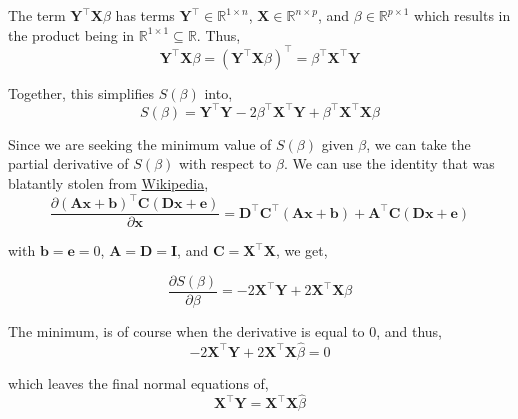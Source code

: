\documentclass[12pt,letterpaper, onecolumn]{exam}
\begin{document}
\begin{questions}
\begin{solution}
\begin{enumerate}[a.)]
            The term $\textbf{Y}^\intercal\textbf{X}\beta$ has terms $\textbf{Y}^\intercal\in\mathbb{R}^{1\times n}$, $\textbf{X}\in\mathbb{R}^{n\times p}$, and $\beta\in\mathbb{R}^{p\times1}$ which results in the product being in $\mathbb{R}^{1\times1}\subseteq\mathbb{R}$. Thus, 
            \begin{equation*}
                \textbf{Y}^\intercal\textbf{X}\beta=(\textbf{Y}^\intercal\textbf{X}\beta)^\intercal = \beta^\intercal\textbf{X}^\intercal \textbf{Y}
            \end{equation*}

            Together, this simplifies $S(\beta)$ into,
            \begin{equation*}
                S(\beta)= \textbf{Y}^\intercal\textbf{Y} - 2 \beta^\intercal\textbf{X}^\intercal\textbf{Y} + \beta^\intercal\textbf{X}^\intercal\textbf{X}\beta
            \end{equation*}

            Since we are seeking the minimum value of $S(\beta)$ given $\beta$, we can take the partial derivative of $S(\beta)$ with respect to $\beta$. We can use the identity that was blatantly stolen from \href{https://en.wikipedia.org/wiki/Matrix_calculus}{Wikipedia},
            \begin{equation*}
                \frac{\partial (\textbf{Ax}+\textbf{b})^\intercal\textbf{C}(\textbf{Dx} + \textbf{e})}{\partial \textbf{x}} = \textbf{D}^\intercal\textbf{C}^\intercal(\textbf{Ax}+\textbf{b})+\textbf{A}^\intercal \textbf{C}(\textbf{Dx}+\textbf{e})
            \end{equation*}

            with $\textbf{b}=\textbf{e}=0$, $\textbf{A}=\textbf{D}=\textbf{I}$, and $\textbf{C}=\textbf{X}^\intercal\textbf{X}$, we get, 

            \begin{equation*}
                \frac{\partial S(\beta)}{\partial\beta} = - 2 \textbf{X}^\intercal\textbf{Y} + 2\textbf{X}^\intercal\textbf{X}\beta
            \end{equation*}

            The minimum, is of course when the derivative is equal to 0, and thus,
            \begin{equation*}
                - 2 \textbf{X}^\intercal\textbf{Y} + 2\textbf{X}^\intercal\textbf{X}\hat{\beta} = 0
            \end{equation*}

            which leaves the final normal equations of,
            \begin{equation*}
                \textbf{X}^\intercal\textbf{Y} = \textbf{X}^\intercal\textbf{X}\hat{\beta}
            \end{equation*}


\end{enumerate}
\end{solution}
\end{questions}
\end{document}

